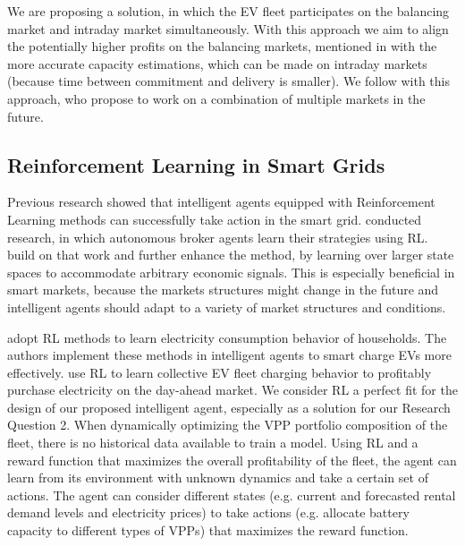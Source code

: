 \documentclass[12pt, article]{article}
\begin{document}
We are proposing a solution, in which the EV fleet participates on the balancing
market and intraday market simultaneously. With this approach we aim to align
the potentially higher profits on the balancing markets, mentioned in
\textcite{tomic07_using_fleet_elect_drive_vehic_grid_suppor} with the more
accurate capacity estimations, which can be made on intraday markets (because
time between commitment and delivery is smaller). We follow
\textcite{kahlen17_fleet} with this approach, who propose to work on a combination
of multiple markets in the future.

\subsection{Reinforcement Learning in Smart Grids}
\label{sec:org5d62e47}

Previous research showed that intelligent agents equipped with Reinforcement
Learning methods can successfully take action in the smart grid.
\textcite{reddy11_strat,reddy11_learn_behav_multip_auton_agent} conducted
research, in which autonomous broker agents \parencite{ketter13_power_tac} learn
their strategies using RL. \textcite{peters13_reinf_learn_approac_to_auton} build
on that work and further enhance the method, by learning over larger state
spaces to accommodate arbitrary economic signals. This is especially beneficial
in smart markets, because the markets structures might change in the future and
intelligent agents should adapt to a variety of market structures and
conditions.

\parencite{vazquez-canteli19_reinf_learn_deman_respon}


\textcite{valogianni14_effec_manag_elect_vehic_storag} adopt RL methods to learn
electricity consumption behavior of households. The authors implement these
methods in intelligent agents to smart charge EVs more effectively.
\textcite{vandael15_reinf_learn_heuris_ev_fleet} use RL to learn collective EV
fleet charging behavior to profitably purchase electricity on the day-ahead
market. We consider RL a perfect fit for the design of our proposed intelligent
agent, especially as a solution for our Research Question 2. When dynamically
optimizing the VPP portfolio composition of the fleet, there is no historical
data available to train a model. Using RL and a reward function that maximizes
the overall profitability of the fleet, the agent can learn from its environment
with unknown dynamics and take a certain set of actions. The agent can consider
different states (e.g. current and forecasted rental demand levels and
electricity prices) to take actions (e.g. allocate battery capacity to different
types of VPPs) that maximizes the reward function.
\end{document}
